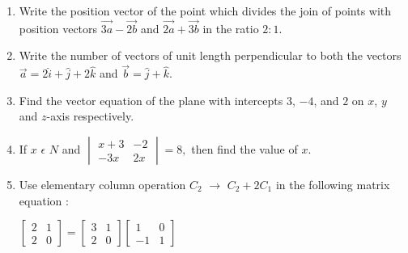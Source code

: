 \documentclass{article}
\begin{document}
\begin{enumerate}
\item Write the position vector of the point which divides the join of points with position vectors $ \overrightarrow{3a} - \overrightarrow{2b}$ and $\overrightarrow{2a}+\overrightarrow{3b}$ in the ratio $2:1$.
\item Write the number of vectors of unit length perpendicular to both the vectors$\overrightarrow{a} = 2\hat{i} + \hat{j} + 2\hat{k}$  and $\overrightarrow{b} = \hat{j} + \hat{k}$.
\item Find the vector equation of the plane with intercepts $3$, $- 4$, and $2$ on $x$, $y$ and $z$-axis respectively.
\item If $x$ $\epsilon$ $N$ and $\begin{vmatrix} x+3 & -2 \\
		-3x & 2x
	\end{vmatrix}= 8, $
then find the value of $x$.

\item Use elementary column operation $C_2$ $\rightarrow$ $C_{2}+2C_{1}$ in the following  matrix  equation :

$\begin{bmatrix}  2 & 1 \\ 2 & 0 \end{bmatrix}=
\begin{bmatrix} 3 & 1 \\ 2 & 0 \end{bmatrix}
\begin{bmatrix} 1 & 0 \\ -1 & 1 \end{bmatrix}$


\end{enumerate}
\end{document}
